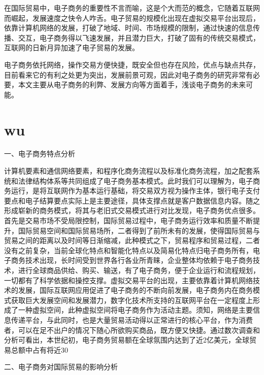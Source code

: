 在国际贸易中，电子商务的重要性不言而喻，这是个大而范的概念，它随着互联网而崛起，发展速度之快令人咋舌。电子贸易的规模化出现在虚拟交易平台出现后，依靠计算机网络的发展，打破了地域、时间、市场规模的限制，通过快速的信息传播、交互，电子商务得以飞速发展，并且潜力巨大，打破了固有的传统交易模式，互联网的日新月异加速了电子贸易的发展。

电子商务依托网络，操作交易方便快捷，既安全但也存在风险，优点与缺点共存，目前看来它的有利之处更为突出，发展前景可观，因此对电子商务的研究非常有必要，本文主要从电子商务的利弊、发展方向等方面着手，浅谈电子商务的未来可能。

\section{wu}
一、电子商务特点分析

计算机要素和通信网络要素，和程序化商务流程以及标准化商务流程，加之配套系统和法律结构体系等共同组成了电子商务基本模式。此时我们可以理解为，电子商务运行，是将互联网作为基本运行基础，将交易双方视为操作主体，银行电子支付要点和电子结算要点实际上是主要途径，具体支撑点就是客户数据信息内容。随之形成崭新的商务模式，将其与老旧式交易模式进行对比发现，电子商务优点很多。首先是交易市场不受局限控制，国际贸易过程中，电子商务运行效率和质量不断提升，国际贸易空间和国际贸易场所，二者得到了前所未有的发展，使得国际贸易与贸易之间的距离以及时间等日渐缩减，此种模式之下，贸易程序和贸易过程，二者没有之前复杂，当前全球化特点和智能化特点以及简易化特点归电子商务所有，电子商务技术出现，长时间受到世界各行各业所青睐，企业整体均依赖于电子商务技术，进行全球商品供给、购买、输送，有了电子商务，便于企业运行和流程规划，一切都有了科学依据和操控支撑。虚拟交易平台的出现，主要依靠着计算机网络技术的发展，国际互联网应用促进了电子商务的不断向前发展，电子商务内在商务模式获取巨大发展空间和发展潜力，数字化技术所支持的互联网平台在一定程度上形成了一种虚拟空间，此种虚拟空间将电子商务作为活动主题。须知，网络是主要信息传递平台，与此同时，也是大量贸易活动得以正常进行的核心平台，作为消费者，可以在足不出户的情况下随心所欲购买商品，既方便又快捷。通过数次调查和分析可看出，本世纪初，电子商务贸易额在全球氛围内达到了近2亿美元，全球贸易总额中占有将近30%

二、电子商务对国际贸易的影响分析

